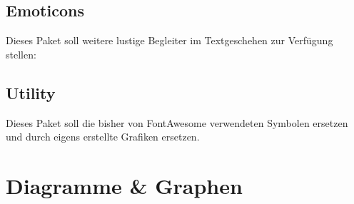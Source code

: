 \subsection{Emoticons  }
Dieses Paket soll weitere lustige Begleiter im Textgeschehen zur Verfügung stellen:

\subsection{Utility  }
Dieses Paket soll die bisher von FontAwesome verwendeten Symbolen ersetzen und durch eigens erstellte Grafiken ersetzen.
%
%
%
%
%
\section{Diagramme \& Graphen}
